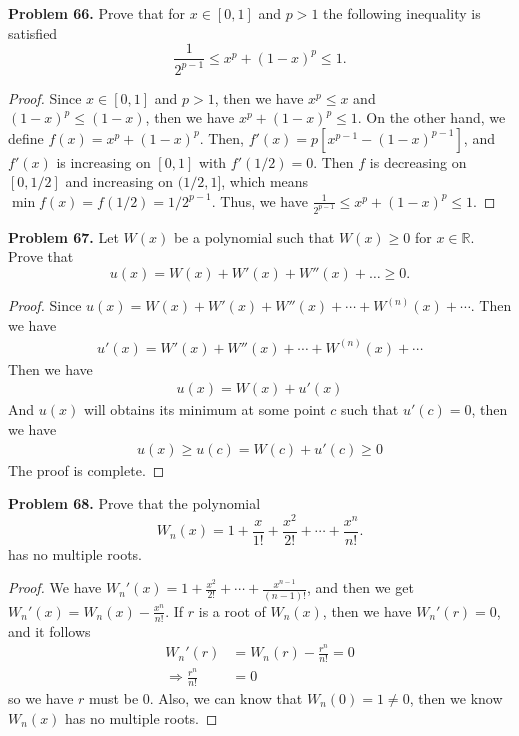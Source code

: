 \documentclass[12pt,leqno]{amsart}
\theoremstyle{definition}
\begin{document}
\medskip


\noindent
{\bf Problem 66.}
Prove that for $x\in [0,1]$ and $p>1$ the following inequality is satisfied
$$
\frac{1}{2^{p-1}}\leq x^p + (1-x)^p\leq 1.
$$
\begin{proof}
Since $x\in[0,1]$ and $p>1$, then we have $x^p\leq x$ and $(1-x)^p\leq (1-x)$, then we have $x^p + (1-x)^p\leq 1$. On the other hand, we define $f(x)=x^p + (1-x)^p$. Then, $f'(x)=p[x^{p-1}-(1-x)^{p-1}]$, and $f'(x)$ is increasing on $[0,1]$ with $f'(1/2)=0$. Then $f$ is decreasing on $[0,1/2]$ and increasing on $(1/2,1]$, which means $\min f(x)=f(1/2)=1/2^{p-1}$. Thus, we have $\frac{1}{2^{p-1}}\leq x^p + (1-x)^p\leq 1$.
\end{proof}

\medskip


\noindent
{\bf Problem 67.}
Let $W(x)$ be a polynomial such that $W(x)\geq 0$ for $x\in\mathbb{R}$. Prove that
$$
u(x) = W(x) + W'(x) + W''(x)+\ldots\geq 0.
$$
\begin{proof}
Since $u(x)=W(x) + W'(x) + W''(x)+ \cdots +W^{(n)}(x) + \cdots$. Then we have
\begin{align*}
    u'(x) = W'(x) + W''(x)+ \cdots +W^{(n)}(x) + \cdots
\end{align*}
Then we have 
\begin{align*}
    u(x)=W(x)+u'(x)
\end{align*}
And $u(x)$ will obtains its minimum at some point $c$ such that $u'(c)=0$, then we have 
\begin{align*}
    u(x)\geq u(c)=W(c)+u'(c)\geq 0
\end{align*}
The proof is complete.
\end{proof}

\medskip

\noindent
{\bf Problem 68.}
Prove that the polynomial
$$
W_n(x) = 1+\frac{x}{1!} + \frac{x^2}{2!} + \cdots + \frac{x^n}{n!}.
$$
has no multiple roots.
\begin{proof}
We have $W_n'(x)=1+\frac{x^2}{2!}+\cdots+\frac{x^{n-1}}{(n-1)!}$, and then we get $W_n'(x)=W_n(x)-\frac{x^n}{n!}$. If $r$ is a root of $W_n(x)$, then we have $W_n'(r)=0$, and it follows 
\begin{align*}
    W_n'(r) & =W_n(r)-\frac{r^n}{n!} = 0\\
    \Rightarrow \frac{r^n}{n!} & = 0
\end{align*}
so we have $r$ must be $0$. Also, we can know that $W_n(0)=1\neq 0$, then we know $W_n(x)$ has no multiple roots.
\end{proof}
\end{document}
